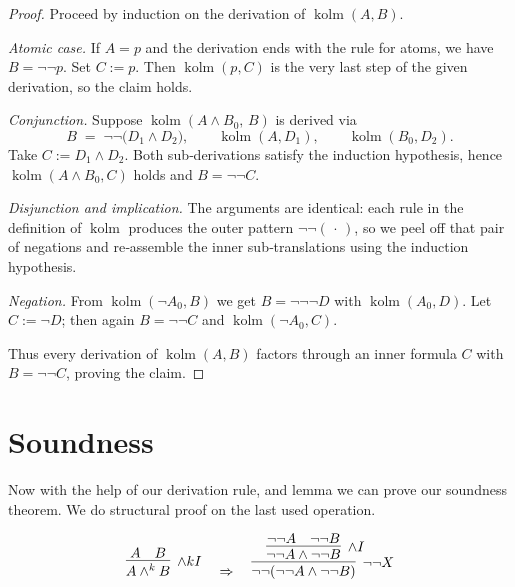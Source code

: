 \documentclass{article}
\begin{document}
    \begin{proof}
    Proceed by induction on the derivation of \(\operatorname{kolm}(A,B)\).
    
    \smallskip
    \emph{Atomic case.}  
    If \(A=p\) and the derivation ends with the rule for atoms, we have
    \(B=\neg\neg p\).  
    Set \(C:=p\).  
    Then \(\operatorname{kolm}(p,C)\) is the very last step of the given
    derivation, so the claim holds.
    
    \smallskip
    \emph{Conjunction.}  
    Suppose \(\operatorname{kolm}(A\land B_0,\,B)\) is derived via
    \[
       B \;=\; \neg\neg\bigl(D_1\land D_2\bigr),
       \qquad
       \operatorname{kolm}(A,D_1),
       \qquad
       \operatorname{kolm}(B_0,D_2).
    \]
    Take \(C := D_1\land D_2\).
    Both sub‑derivations satisfy the induction hypothesis, hence
    \(\operatorname{kolm}(A\land B_0,C)\) holds and
    \(B=\neg\neg C\).
    
    \smallskip
    \emph{Disjunction and implication.}  
    The arguments are identical: each rule in the definition of
    \(\operatorname{kolm}\) produces the outer pattern
    \(\neg\neg(\,\cdot\,)\), so we peel off that pair of negations and
    re‑assemble the inner sub‑translations using the induction hypothesis.
    
    \smallskip
    \emph{Negation.}  
    From \(\operatorname{kolm}(\neg A_0,B)\) we get
    \(B=\neg\neg\neg D\) with \(\operatorname{kolm}(A_0,D)\).
    Let \(C := \neg D\); then again \(B=\neg\neg C\) and
    \(\operatorname{kolm}(\neg A_0,C)\).
    
    \smallskip
    Thus every derivation of \(\operatorname{kolm}(A,B)\) factors through
    an inner formula \(C\) with \(B=\neg\neg C\), proving the claim.
    \end{proof}
    



\section{Soundness}

Now with the help of our derivation rule, and lemma we can prove our soundness theorem. We do structural proof on the last used operation.

\vspace{3em}
\[
\infer[\land kI]{A \land^k B}{A & B}
\quad \Rightarrow \quad
\infer[\neg\neg X]{\neg\neg(\neg\neg A \land \neg\neg B)}{
    \infer[\land I]{\neg\neg A \land \neg\neg B}{
      \neg\neg A & \neg\neg B
    }
}
\]
\end{document}
